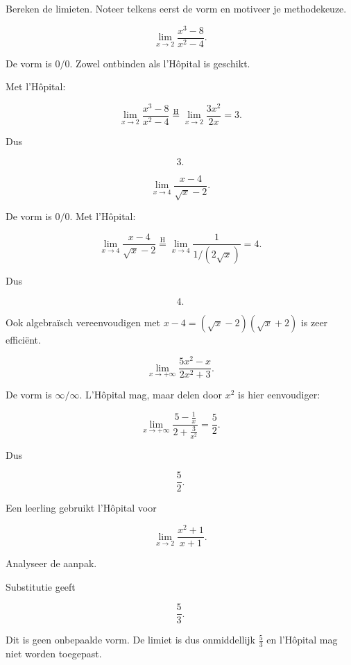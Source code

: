 \documentclass{ximera}
\begin{document}
\begin{oefening}{\oefU\ESS}
  
Bereken de limieten. Noteer telkens eerst de vorm en motiveer je
methodekeuze.

\begin{question}
\[\lim_{x\to2}\frac{x^3-8}{x^2-4}.\]

\begin{oplossing}
De vorm is \(0/0\). Zowel ontbinden als l'Hôpital is geschikt.

Met l'Hôpital:

\[
\lim_{x\to2}\frac{x^3-8}{x^2-4}
\overset{\mathrm H}{=}
\lim_{x\to2}\frac{3x^2}{2x}
=3.
\]

Dus

\[\boxed{3}.\]
\end{oplossing}
\end{question}

\begin{question}
\[\lim_{x\to4}\frac{x-4}{\sqrt{x}-2}.\]

\begin{oplossing}
De vorm is \(0/0\). Met l'Hôpital:

\[
\lim_{x\to4}\frac{x-4}{\sqrt{x}-2}
\overset{\mathrm H}{=}
\lim_{x\to4}\frac{1}{1/(2\sqrt{x})}
=4.
\]

Dus

\[\boxed{4}.\]

Ook algebraïsch vereenvoudigen met
\(x-4=(\sqrt{x}-2)(\sqrt{x}+2)\) is zeer efficiënt.
\end{oplossing}
\end{question}

\begin{question}
\[\lim_{x\to+\infty}\frac{5x^2-x}{2x^2+3}.\]

\begin{oplossing}
De vorm is \(\infty/\infty\). L'Hôpital mag, maar delen door \(x^2\)
is hier eenvoudiger:

\[
\lim_{x\to+\infty}\frac{5-\frac1x}{2+\frac3{x^2}}
=\frac52.
\]

Dus

\[\boxed{\frac52}.\]
\end{oplossing}
\end{question}

\begin{question}
Een leerling gebruikt l'Hôpital voor

\[\lim_{x\to2}\frac{x^2+1}{x+1}.\]

Analyseer de aanpak.

\begin{oplossing}
Substitutie geeft

\[\frac53.\]

Dit is geen onbepaalde vorm. De limiet is dus onmiddellijk
\(\frac53\) en l'Hôpital mag niet worden toegepast.
\end{oplossing}
\end{question}
\end{oefening}
\end{document}
